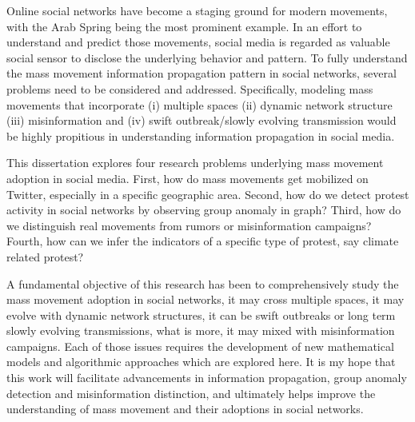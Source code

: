 \documentclass[12pt,dvips]{report}
\begin{document}
Online social networks have become a staging ground for modern movements, with the Arab
Spring being the most prominent example. In an effort to understand and predict those movements, social media is regarded as valuable social sensor to disclose the underlying behavior and pattern. To fully understand the mass movement information propagation pattern in social networks, several problems need to be considered and addressed. Specifically, modeling mass movements that incorporate (i) multiple spaces (ii) dynamic network structure (iii) misinformation and (iv) swift outbreak/slowly evolving transmission would be highly propitious in understanding information propagation in social media.

This dissertation explores four research problems underlying mass movement adoption in social media. First, how do mass movements get mobilized on Twitter, especially in a specific geographic area. Second, how do we detect protest activity in social networks by observing group anomaly in graph?
Third, how do we distinguish real movements from rumors or misinformation campaigns? Fourth, how can we infer the indicators of a specific type of protest, say climate related protest?

A fundamental objective of this research has been to comprehensively study the mass movement adoption in social networks, it may cross multiple spaces, it may evolve with dynamic network structures, it can be swift outbreaks or long term slowly evolving transmissions, what is more, it may mixed with misinformation campaigns. Each of those issues requires the development of new mathematical models and algorithmic approaches which are explored here.  It is my hope that this work will facilitate advancements in information propagation, group anomaly detection and misinformation distinction, and ultimately helps improve the understanding of mass movement and their adoptions in social networks.

\end{document}
